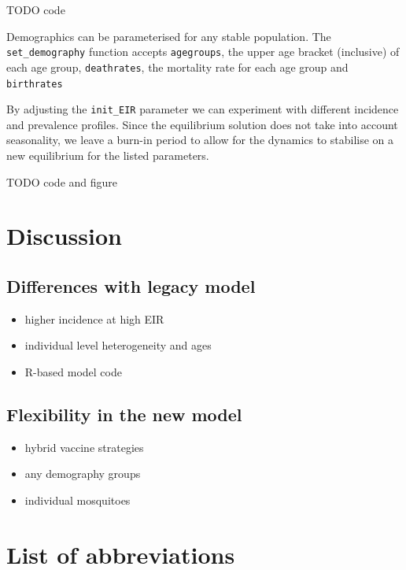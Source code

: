 \documentclass{bmcart}
\begin{document}
TODO code

Demographics can be parameterised for any stable population. The \lstinline{set_demography} function accepts \lstinline{agegroups}, the upper age bracket (inclusive) of each age group, \lstinline{deathrates}, the mortality rate for each age group and \lstinline{birthrates}

By adjusting the \lstinline{init_EIR} parameter we can experiment with different incidence and prevalence profiles. Since the equilibrium solution does not take into account seasonality, we leave a burn-in period to allow for the dynamics to stabilise on a new equilibrium for the listed parameters.

TODO code and figure

\section*{Discussion}

\subsection*{Differences with legacy model}

\begin{itemize}
    \item higher incidence at high EIR
    \item individual level heterogeneity and ages
    \item R-based model code
\end{itemize}

\subsection*{Flexibility in the new model}

\begin{itemize}
    \item hybrid vaccine strategies
    \item any demography groups
    \item individual mosquitoes
\end{itemize}

\section*{List of abbreviations}

\end{document}

